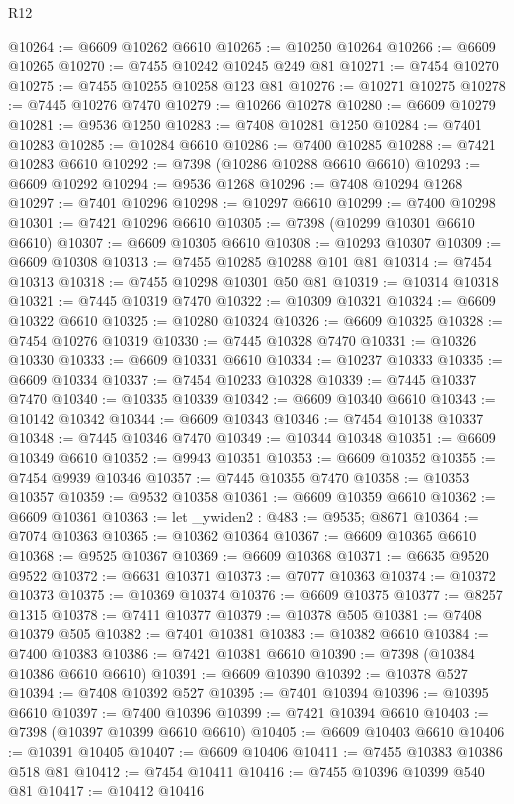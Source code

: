 \begin{lexlean}{R12}
\begin{coremodule}
{{{{{{{{{{{{{{{{{{{{{{{{{{{{{{{{{{{{{{{{{{{{{{{{{{{{{{{{{{{{{{{{{{{{{{{{{{{{{{{{{{@10264 := @6609 @10262 @6610
@10265 := @10250 @10264
@10266 := @6609 @10265
@10270 := @7455 @10242 @10245 @249 @81
@10271 := @7454 @10270
@10275 := @7455 @10255 @10258 @123 @81
@10276 := @10271 @10275
@10278 := @7445 @10276 @7470
@10279 := @10266 @10278
@10280 := @6609 @10279
@10281 := @9536 @1250
@10283 := @7408 @10281 @1250
@10284 := @7401 @10283
@10285 := @10284 @6610
@10286 := @7400 @10285
@10288 := @7421 @10283 @6610
@10292 := @7398 (@10286 @10288 @6610 @6610)
@10293 := @6609 @10292
@10294 := @9536 @1268
@10296 := @7408 @10294 @1268
@10297 := @7401 @10296
@10298 := @10297 @6610
@10299 := @7400 @10298
@10301 := @7421 @10296 @6610
@10305 := @7398 (@10299 @10301 @6610 @6610)
@10307 := @6609 @10305 @6610
@10308 := @10293 @10307
@10309 := @6609 @10308
@10313 := @7455 @10285 @10288 @101 @81
@10314 := @7454 @10313
@10318 := @7455 @10298 @10301 @50 @81
@10319 := @10314 @10318
@10321 := @7445 @10319 @7470
@10322 := @10309 @10321
@10324 := @6609 @10322 @6610
@10325 := @10280 @10324
@10326 := @6609 @10325
@10328 := @7454 @10276 @10319
@10330 := @7445 @10328 @7470
@10331 := @10326 @10330
@10333 := @6609 @10331 @6610
@10334 := @10237 @10333
@10335 := @6609 @10334
@10337 := @7454 @10233 @10328
@10339 := @7445 @10337 @7470
@10340 := @10335 @10339
@10342 := @6609 @10340 @6610
@10343 := @10142 @10342
@10344 := @6609 @10343
@10346 := @7454 @10138 @10337
@10348 := @7445 @10346 @7470
@10349 := @10344 @10348
@10351 := @6609 @10349 @6610
@10352 := @9943 @10351
@10353 := @6609 @10352
@10355 := @7454 @9939 @10346
@10357 := @7445 @10355 @7470
@10358 := @10353 @10357
@10359 := @9532 @10358
@10361 := @6609 @10359 @6610
@10362 := @6609 @10361
@10363 := let _ywiden2 : @483 := @9535; @8671
@10364 := @7074 @10363
@10365 := @10362 @10364
@10367 := @6609 @10365 @6610
@10368 := @9525 @10367
@10369 := @6609 @10368
@10371 := @6635 @9520 @9522
@10372 := @6631 @10371
@10373 := @7077 @10363
@10374 := @10372 @10373
@10375 := @10369 @10374
@10376 := @6609 @10375
@10377 := @8257 @1315
@10378 := @7411 @10377
@10379 := @10378 @505
@10381 := @7408 @10379 @505
@10382 := @7401 @10381
@10383 := @10382 @6610
@10384 := @7400 @10383
@10386 := @7421 @10381 @6610
@10390 := @7398 (@10384 @10386 @6610 @6610)
@10391 := @6609 @10390
@10392 := @10378 @527
@10394 := @7408 @10392 @527
@10395 := @7401 @10394
@10396 := @10395 @6610
@10397 := @7400 @10396
@10399 := @7421 @10394 @6610
@10403 := @7398 (@10397 @10399 @6610 @6610)
@10405 := @6609 @10403 @6610
@10406 := @10391 @10405
@10407 := @6609 @10406
@10411 := @7455 @10383 @10386 @518 @81
@10412 := @7454 @10411
@10416 := @7455 @10396 @10399 @540 @81
@10417 := @10412 @10416
}}}}}}}}}}}}}}}}}}}}}}}}}}}}}}}}}}}}}}}}}}}}}}}}}}}}}}}}}}}}}}}}}}}}}}}}}}}}}}}}}}
\end{coremodule}
\end{lexlean}

